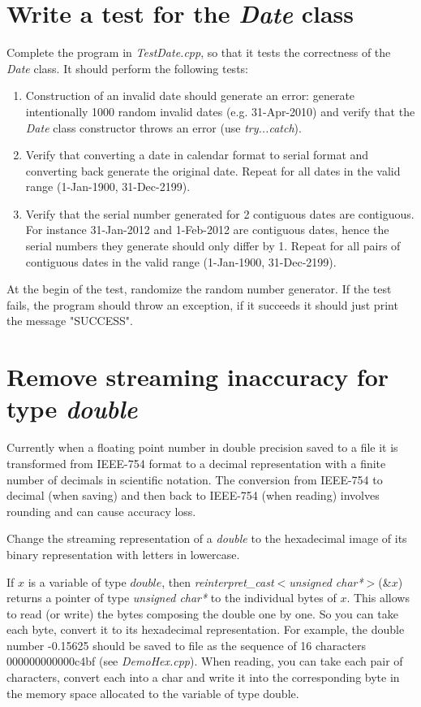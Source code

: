 \documentclass[10pt]{article}
\begin{document}
\section{Write a test for the \textit{Date} class}
Complete the program in \textit{TestDate.cpp}, so that it tests the correctness of the \textit{Date} class. It should perform the following tests:
\begin{enumerate}
\item Construction of an invalid date should generate an error: generate intentionally 1000 random invalid dates (e.g. 31-Apr-2010) and verify that the \textit{Date} class constructor throws an error (use \textit{try...catch}).
\item Verify that converting a date in calendar format to serial format and converting back generate the original date. Repeat for all dates in the valid range (1-Jan-1900, 31-Dec-2199).
\item Verify that the serial number generated for 2 contiguous dates are contiguous. For instance 31-Jan-2012 and 1-Feb-2012 are contiguous dates, hence the serial numbers they generate should only differ by 1. Repeat for all pairs of contiguous dates in the valid range (1-Jan-1900, 31-Dec-2199).
\end{enumerate}
At the begin of the test, randomize the random number generator. If the test fails, the program should throw an exception, if it succeeds it should just print the message "SUCCESS".

\section{Remove streaming inaccuracy for type \textit{double}}
Currently when a floating point number in double precision saved to a file it is transformed from IEEE-754 format to a decimal representation with a finite number of decimals in scientific notation. The conversion from IEEE-754 to decimal (when saving) and then back to IEEE-754 (when reading) involves rounding and can cause accuracy loss.

Change the streaming representation of a \textit{double} to the hexadecimal image of its binary representation with letters in lowercase.

If $x$ is a variable of type $double$, then \textit{reinterpret\_cast$<$unsigned char*$>$}(\&$x$) returns a pointer of type \textit{unsigned char*} to the individual bytes of $x$. This allows to read (or write) the bytes composing the double one by one. So you can take each byte, convert it to its hexadecimal representation. For example, the double number -0.15625 should be saved to file as the sequence of 16 characters 000000000000c4bf (see \textit{DemoHex.cpp}). When reading, you can take each pair of characters, convert each into a char and write it into the corresponding byte in the memory space allocated to the variable of type double.
\end{document}
